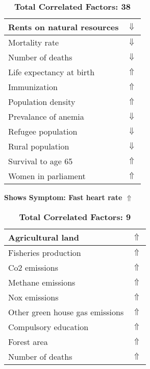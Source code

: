 \documentclass[12pt,notitlepage,oneside]{report}
\begin{document}
\begin{table}[!htb]
\begin{tabular}{|l|l|}
Rents on natural resources & $\Downarrow$\\ \hline
Mortality rate & $\Downarrow$\\ \hline
Number of deaths & $\Downarrow$\\ \hline
Life expectancy at birth & $\Uparrow$\\ \hline
Immunization & $\Uparrow$\\ \hline
Population density & $\Uparrow$\\ \hline
Prevalance of anemia & $\Downarrow$\\ \hline
Refugee population & $\Downarrow$\\ \hline
Rural population & $\Downarrow$\\ \hline
Survival to age 65 & $\Uparrow$\\ \hline
Women in parliament & $\Uparrow$\\ \hline
\end{tabular}
\caption*{\textbf{Total Correlated Factors: 38}}
\end{table}
\clearpage
\begin{table}[!htb]
\caption{\textbf{Shows Symptom: Fast heart rate $\Uparrow$}}
\centering
\label{Correlated Socio-economic Factors0}
\begin{tabular}{|l|l|}
\hline
Agricultural land & $\Uparrow$\\ \hline
Fisheries production & $\Uparrow$\\ \hline
Co2 emissions & $\Uparrow$\\ \hline
Methane emissions & $\Uparrow$\\ \hline
Nox emissions & $\Uparrow$\\ \hline
Other green house gas emissions & $\Uparrow$\\ \hline
Compulsory education & $\Uparrow$\\ \hline
Forest area & $\Uparrow$\\ \hline
Number of deaths & $\Uparrow$\\ \hline
\end{tabular}
\caption*{\textbf{Total Correlated Factors: 9}}
\end{table}
\end{document}

